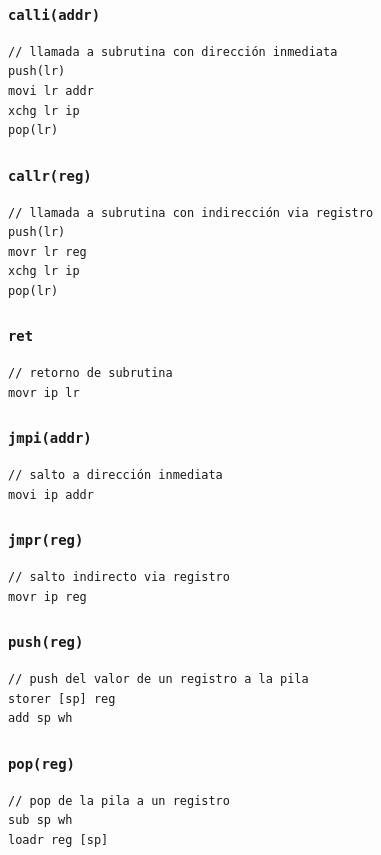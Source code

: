 \documentclass{article}
\begin{document}
\subsubsection{\texttt{calli(addr)}}
\begin{verbatim}
// llamada a subrutina con dirección inmediata
push(lr)
movi lr addr
xchg lr ip
pop(lr)
\end{verbatim}
\subsubsection{\texttt{callr(reg)}}
\begin{verbatim}
// llamada a subrutina con indirección via registro
push(lr)
movr lr reg
xchg lr ip
pop(lr)
\end{verbatim}
\subsubsection{\texttt{ret}}
\begin{verbatim}
// retorno de subrutina
movr ip lr
\end{verbatim}
\subsubsection{\texttt{jmpi(addr)}}
\begin{verbatim}
// salto a dirección inmediata
movi ip addr
\end{verbatim}
\subsubsection{\texttt{jmpr(reg)}}
\begin{verbatim}
// salto indirecto via registro
movr ip reg
\end{verbatim}
\subsubsection{\texttt{push(reg)}}
\begin{verbatim}
// push del valor de un registro a la pila
storer [sp] reg
add sp wh
\end{verbatim}
\subsubsection{\texttt{pop(reg)}}
\begin{verbatim}
// pop de la pila a un registro
sub sp wh
loadr reg [sp]
\end{verbatim}
\end{document}
